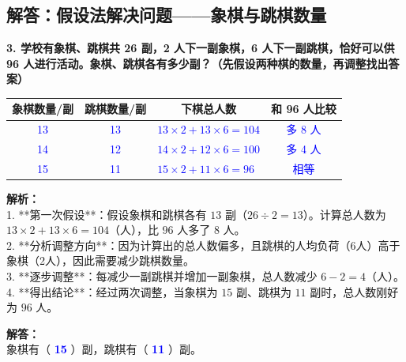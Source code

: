 \newpage

\newpage

\subsection{解答：假设法解决问题——象棋与跳棋数量}

\vspace{0.4cm}

\noindent\textbf{3. 学校有象棋、跳棋共 26 副，2 人下一副象棋，6 人下一副跳棋，恰好可以供 96 人进行活动。象棋、跳棋各有多少副？（先假设两种棋的数量，再调整找出答案）}

\vspace{0.8cm}

\begin{center}
\renewcommand{\arraystretch}{1.8}
\begin{tabular}{|c|c|l|c|}
\hline
\textbf{象棋数量/副} & \textbf{跳棋数量/副} & \multicolumn{1}{c|}{\textbf{下棋总人数}} & \textbf{和 96 人比较} \\ \hline
\textcolor{blue}{13} & \textcolor{blue}{13} & \textcolor{blue}{$13 \times 2 + 13 \times 6 = 104$} & \textcolor{blue}{多 8 人} \\ \hline
\textcolor{blue}{14} & \textcolor{blue}{12} & \textcolor{blue}{$14 \times 2 + 12 \times 6 = 100$} & \textcolor{blue}{多 4 人} \\ \hline
\textcolor{blue}{15} & \textcolor{blue}{11} & \textcolor{blue}{$15 \times 2 + 11 \times 6 = 96$} & \textcolor{blue}{相等} \\ \hline
\end{tabular}
\end{center}

\vspace{0.6cm}

{\small\color{gray}
\textbf{解析：}\\
1. **第一次假设**：假设象棋和跳棋各有 $13$ 副（$26 \div 2 = 13$）。计算总人数为 $13 \times 2 + 13 \times 6 = 104$（人），比 $96$ 人多了 $8$ 人。\\
2. **分析调整方向**：因为计算出的总人数偏多，且跳棋的人均负荷（6人）高于象棋（2人），因此需要减少跳棋数量。\\
3. **逐步调整**：每减少一副跳棋并增加一副象棋，总人数减少 $6 - 2 = 4$（人）。\\
4. **得出结论**：经过两次调整，当象棋为 $15$ 副、跳棋为 $11$ 副时，总人数刚好为 $96$ 人。
}

\vspace{0.4cm}
\noindent\textbf{解答：}\\
象棋有（ \textbf{\textcolor{blue}{15}} ）副，跳棋有（ \textbf{\textcolor{blue}{11}} ）副。

